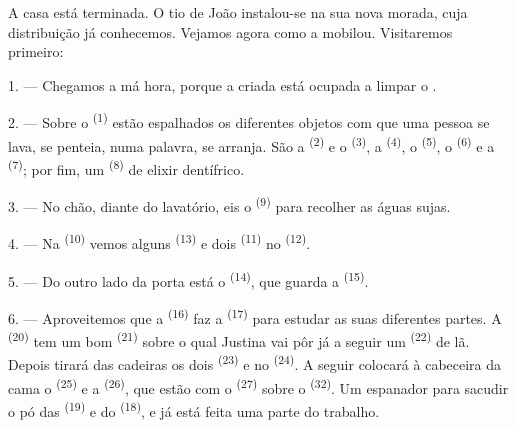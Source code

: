 %

\VUsaut{6.0mm}
\VUsaut{1.4mm}
\VUsaut{0.4mm}
\VUsaut{2.2mm}

A casa está terminada. O tio de João instalou-se na sua nova morada,
cuja distribuição já conhecemos. Vejamos agora como a mobilou.
Visitaremos primeiro:

\VUsaut{3.0mm}

1. --- Chegamos a má hora, porque a criada está ocupada a limpar o
.

2. --- Sobre o  \textsuperscript{(1)} estão espalhados os
diferentes objetos com que uma pessoa se lava, se penteia, numa palavra,
se arranja. São a  \textsuperscript{(2)} e o 
\textsuperscript{(3)}, a  \textsuperscript{(4)}, o
 \textsuperscript{(5)}, o  \textsuperscript{(6)} e a
 \textsuperscript{(7)}; por fim, um 
\textsuperscript{(8)} de elixir dentífrico.

3. --- No chão, diante do lavatório, eis o  \textsuperscript{(9)}
para recolher as águas sujas.

4. --- Na  \textsuperscript{(10)} vemos alguns 
\textsuperscript{(13)} e dois  \textsuperscript{(11)} no
 \textsuperscript{(12)}.

5. --- Do outro lado da porta está o 
\textsuperscript{(14)}, que guarda a  \textsuperscript{(15)}.

6. --- Aproveitemos que a  \textsuperscript{(16)} faz a
 \textsuperscript{(17)} para estudar as suas diferentes partes. A
 \textsuperscript{(20)} tem um bom 
\textsuperscript{(21)} sobre o qual Justina vai pôr já a seguir um
 \textsuperscript{(22)} de lã. Depois tirará das cadeiras os
dois  \textsuperscript{(23)} e no 
\textsuperscript{(24)}. A seguir colocará à cabeceira da cama o
 \textsuperscript{(25)} e a 
\textsuperscript{(26)}, que estão com o  \textsuperscript{(27)} sobre o
 \textsuperscript{(32)}. Um espanador para sacudir o pó
das  \textsuperscript{(19)} e do 
\textsuperscript{(18)}, e já está feita uma parte do trabalho.

